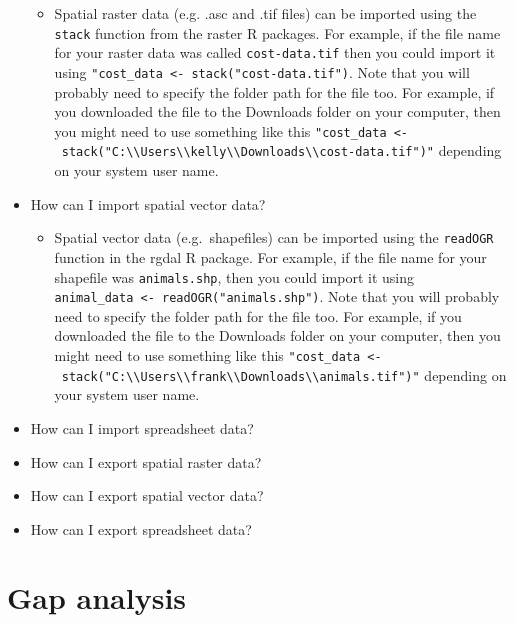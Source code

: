 \documentclass[]{book}
\providecommand{\tightlist}{%
  \setlength{\itemsep}{0pt}\setlength{\parskip}{0pt}}
\begin{document}
\begin{itemize}
  \begin{itemize}
  \tightlist
  \item
    Spatial raster data (e.g. .asc and .tif files) can be imported using
    the \texttt{stack} function from the raster R packages. For example,
    if the file name for your raster data was called
    \texttt{cost-data.tif} then you could import it using
    \texttt{"cost\_data\ \textless{}-\ stack("cost-data.tif")}. Note
    that you will probably need to specify the folder path for the file
    too. For example, if you downloaded the file to the Downloads folder
    on your computer, then you might need to use something like this
    \texttt{"cost\_data\ \textless{}-\ stack("C:\textbackslash{}\textbackslash{}Users\textbackslash{}\textbackslash{}kelly\textbackslash{}\textbackslash{}Downloads\textbackslash{}\textbackslash{}cost-data.tif")"}
    depending on your system user name.
  \end{itemize}
\item
  How can I import spatial vector data?

  \begin{itemize}
  \tightlist
  \item
    Spatial vector data (e.g.~shapefiles) can be imported using the
    \texttt{readOGR} function in the rgdal R package. For example, if
    the file name for your shapefile was \texttt{animals.shp}, then you
    could import it using
    \texttt{animal\_data\ \textless{}-\ readOGR("animals.shp")}. Note
    that you will probably need to specify the folder path for the file
    too. For example, if you downloaded the file to the Downloads folder
    on your computer, then you might need to use something like this
    \texttt{"cost\_data\ \textless{}-\ stack("C:\textbackslash{}\textbackslash{}Users\textbackslash{}\textbackslash{}frank\textbackslash{}\textbackslash{}Downloads\textbackslash{}\textbackslash{}animals.tif")"}
    depending on your system user name.
  \end{itemize}
\item
  How can I import spreadsheet data?
\item
  How can I export spatial raster data?
\item
  How can I export spatial vector data?
\item
  How can I export spreadsheet data?
\end{itemize}

\chapter{Gap analysis}\label{gap-analysis}
\end{document}
